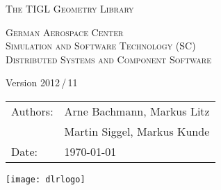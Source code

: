 \begin{titlepage}
\pagestyle{empty}

\begin{minipage}[h]{50mm}
\vspace{-10mm}
\hspace{-17mm}
\end{minipage}
%
\begin{minipage}[h]{80mm}
\vspace{-10mm}
\hspace{70mm}
\end{minipage}

   \begin{center}
       \vspace*{2cm}
       \Huge
       \textsc{The TIGL Geometry Library}

       \vspace{0.5cm}
       \Large
       \textsc{German Aerospace Center\\\vspace{0.3cm}\small{Simulation and Software Technology (SC)\\Distributed Systems and Component Software}}

       \vspace{0.5cm}
       \large
       Version 2012\,/\,11

       \vspace{0.5cm}
       \vspace{1cm}
       \textsc{}
       \vspace{1cm}

      

       \vspace{1cm}
       \Large
       \textsc{}
         \end{center}   
        
   \vfill
   \normalsize
   \begin{tabular}{ll}
       Authors: & Arne Bachmann, Markus Litz\\
                & Martin Siggel, Markus Kunde \\
       Date:   & \today\\
   \end{tabular}

\begin{minipage}[h]{80mm}
\vspace{-15mm}
\hspace{90mm}
\texttt{[image: dlrlogo]}
\end{minipage}

\end{titlepage}
